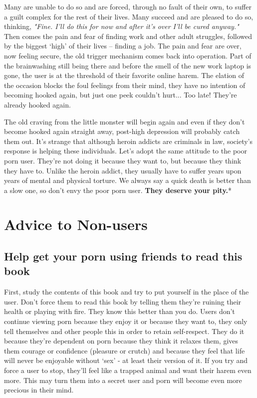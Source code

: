 \documentclass[
]{book}
\begin{document}
Many are unable to do so and are forced, through no fault of their own, to suffer a guilt complex for the rest of their lives. Many succeed and are pleased to do so, thinking, \emph{"Fine. I'll do this for now and after it's over I'll be cured anyway."} Then comes the pain and fear of finding work and other adult struggles, followed by the biggest `high' of their lives -- finding a job. The pain and fear are over, now feeling secure, the old trigger mechanism comes back into operation. Part of the brainwashing still being there and before the smell of the new work laptop is gone, the user is at the threshold of their favorite online harem. The elation of the occasion blocks the foul feelings from their mind, they have no intention of becoming hooked again, but just one peek couldn't hurt... Too late! They're already hooked again.

The old craving from the little monster will begin again and even if they don't become hooked again straight away, post-high depression will probably catch them out. It's strange that although heroin addicts are criminals in law, society's response is helping these individuals. Let's adopt the same attitude to the poor porn user. They're not doing it because they want to, but because they think they have to. Unlike the heroin addict, they usually have to suffer years upon years of mental and physical torture. We always say a quick death is better than a slow one, so don't envy the poor porn user. \textbf{They deserve your pity.}*

\hypertarget{advice-to-non-users}{%
\chapter{Advice to Non-users}\label{advice-to-non-users}}

\hypertarget{help-get-your-porn-using-friends-to-read-this-book}{%
\section{Help get your porn using friends to read this book}\label{help-get-your-porn-using-friends-to-read-this-book}}

First, study the contents of this book and try to put yourself in the place of the user. Don't force them to read this book by telling them they're ruining their health or playing with fire. They know this better than you do. Users don't continue viewing porn because they enjoy it or because they want to, they only tell themselves and other people this in order to retain self-respect. They do it because they're dependent on porn because they think it relaxes them, gives them courage or confidence (pleasure or crutch) and because they feel that life will never be enjoyable without `sex' - at least their version of it. If you try and force a user to stop, they'll feel like a trapped animal and want their harem even more. This may turn them into a secret user and porn will become even more precious in their mind.
\end{document}
